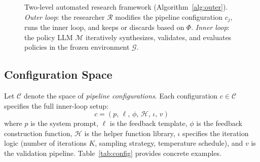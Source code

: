 \documentclass[sigconf,authordraft]{acmart}
\newcommand{\cR}{\mathcal{R}}
\newcommand{\cM}{\mathcal{M}}
\newcommand{\cG}{\mathcal{G}}
\newcommand{\cC}{\mathcal{C}}
\begin{document}
\begin{figure}[t]
\caption{Two-level automated research framework (Algorithm~\ref{alg:outer}). \emph{Outer loop}: the researcher $\cR$ modifies the pipeline configuration $c_j$, runs the inner loop, and keeps or discards based on $\Phi$. \emph{Inner loop}: the policy LLM $\cM$ iteratively synthesizes, validates, and evaluates policies in the frozen environment $\cG$.}
\label{fig:framework}
\end{figure}

\subsection{Configuration Space}

Let $\cC$ denote the space of \emph{pipeline configurations}. Each configuration $c \in \cC$ specifies the full inner-loop setup:
\begin{equation}
  c = (p,\, \ell,\, \phi,\, \mathcal{H},\, \iota,\, v)
\end{equation}
where $p$ is the system prompt, $\ell$ is the feedback template, $\phi$ is the feedback construction function, $\mathcal{H}$ is the helper function library, $\iota$ specifies the iteration logic (number of iterations $K$, sampling strategy, temperature schedule), and $v$ is the validation pipeline. Table~\ref{tab:config} provides concrete examples.
\end{document}
